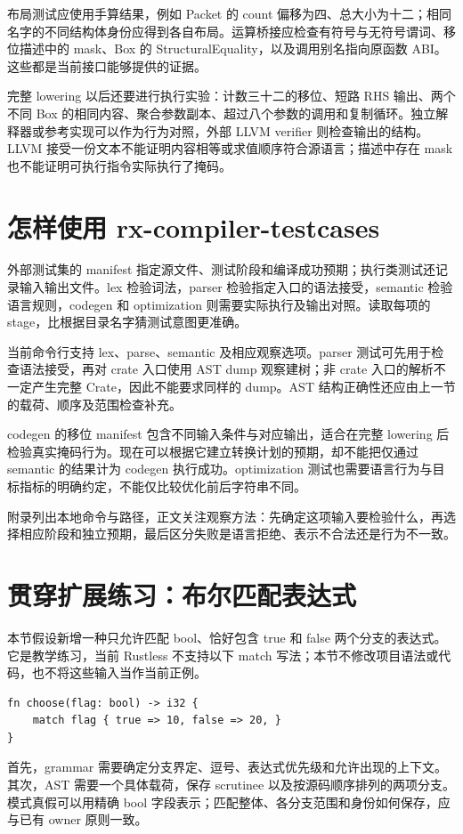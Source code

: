 布局测试应使用手算结果，例如 Packet 的 count 偏移为四、总大小为十二；相同名字的不同结构体身份应得到各自布局。运算桥接应检查有符号与无符号谓词、移位描述中的 mask、Box 的 StructuralEquality，以及调用别名指向原函数 ABI。这些都是当前接口能够提供的证据。

完整 lowering 以后还要进行执行实验：计数三十二的移位、短路 RHS 输出、两个不同 Box 的相同内容、聚合参数副本、超过八个参数的调用和复制循环。独立解释器或参考实现可以作为行为对照，外部 LLVM verifier 则检查输出的结构。LLVM 接受一份文本不能证明内容相等或求值顺序符合源语言；描述中存在 mask 也不能证明可执行指令实际执行了掩码。

\section{怎样使用 rx-compiler-testcases}
外部测试集的 manifest 指定源文件、测试阶段和编译成功预期；执行类测试还记录输入输出文件。lex 检验词法，parser 检验指定入口的语法接受，semantic 检验语言规则，codegen 和 optimization 则需要实际执行及输出对照。读取每项的 stage，比根据目录名字猜测试意图更准确。

当前命令行支持 lex、parse、semantic 及相应观察选项。parser 测试可先用于检查语法接受，再对 crate 入口使用 AST dump 观察建树；非 crate 入口的解析不一定产生完整 Crate，因此不能要求同样的 dump。AST 结构正确性还应由上一节的载荷、顺序及范围检查补充。

codegen 的移位 manifest 包含不同输入条件与对应输出，适合在完整 lowering 后检验真实掩码行为。现在可以根据它建立转换计划的预期，却不能把仅通过 semantic 的结果计为 codegen 执行成功。optimization 测试也需要语言行为与目标指标的明确约定，不能仅比较优化前后字符串不同。

附录列出本地命令与路径，正文关注观察方法：先确定这项输入要检验什么，再选择相应阶段和独立预期，最后区分失败是语言拒绝、表示不合法还是行为不一致。

\section{贯穿扩展练习：布尔匹配表达式}
本节假设新增一种只允许匹配 bool、恰好包含 true 和 false 两个分支的表达式。它是教学练习，当前 Rustless 不支持以下 match 写法；本节不修改项目语法或代码，也不将这些输入当作当前正例。

\begin{lstlisting}[language=Rustless,caption={教学扩展的正确示例：当前尚不支持此语法}]
fn choose(flag: bool) -> i32 {
    match flag { true => 10, false => 20, }
}
\end{lstlisting}
首先，grammar 需要确定分支界定、逗号、表达式优先级和允许出现的上下文。其次，AST 需要一个具体载荷，保存 scrutinee 以及按源码顺序排列的两项分支。模式真假可以用精确 bool 字段表示；匹配整体、各分支范围和身份如何保存，应与已有 owner 原则一致。

